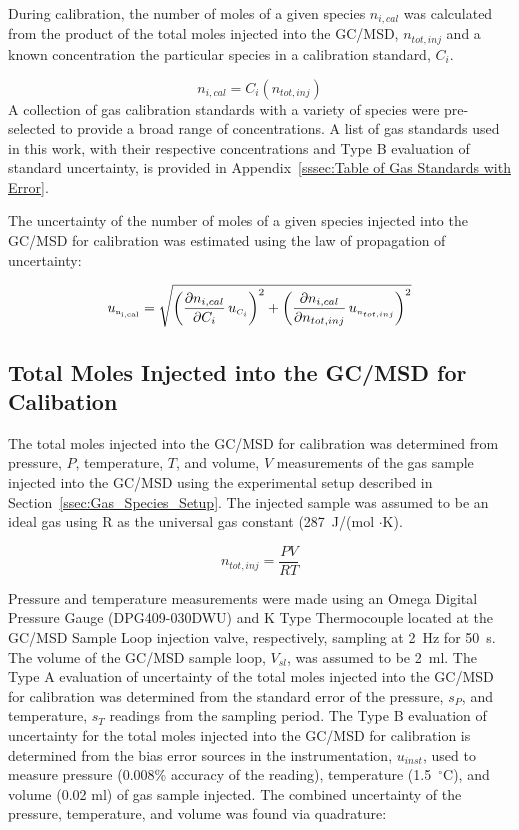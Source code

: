 \documentclass[12pt]{article}
\begin{document}
During calibration, the number of moles of a given species $n_{i,cal}$ was calculated from the product of the total moles injected into the GC/MSD, $n_{tot,inj}$ and a known concentration the particular species in a calibration standard, $C_{i}$.

\begin{equation}
\label{eq:Cal_Moles}
n_{i,cal} = C_{i}(n_{tot,inj})
\end{equation}
A collection of gas calibration standards with a variety of species were pre-selected to provide a broad range of concentrations. A list of gas standards used in this work, with their respective concentrations and Type B evaluation of standard uncertainty, is provided in Appendix~\ref{sssec:Table of Gas Standards with Error}.

The uncertainty of the number of moles of a given species injected into the GC/MSD for calibration was estimated using the law of propagation of uncertainty:

\begin{equation}
\label{eq:Given_Moles_Cal_Uncertainty}
 u_{\rm \scriptscriptstyle n_{i,cal}} = \sqrt{{\left( \frac{\partial n_{i,cal}}{\partial C_{i}}\,u_{\scriptscriptstyle C_{i}} \right)}^2+{\left(\frac{\partial n_{i,cal}}{\partial n_{tot,inj}}\,u_{\scriptscriptstyle n_{tot,inj}}\right)}^2}
\end{equation}

\subsection{Total Moles Injected into the GC/MSD for Calibation}
\label{ssec:Total Moles Injected into the GC/MSD for Calibation}

The total moles injected into the GC/MSD for calibration was determined from pressure, $P$, temperature, $T$, and volume, $V$ measurements of the gas sample injected into the GC/MSD using the experimental setup described in Section~\ref{ssec:Gas_Species_Setup}. The injected sample was assumed to be an ideal gas using R as the universal gas constant (287~J/(mol $\cdot$K).

\begin{equation}
\label{eq:molesinjected}
n_{tot, inj} = \frac{PV}{RT}
\end{equation}

Pressure and temperature measurements were made using an Omega Digital Pressure Gauge (DPG409-030DWU) and K Type Thermocouple located at the GC/MSD Sample Loop injection valve, respectively, sampling at 2~\si{Hz} for 50~\si{s}. The volume of the GC/MSD sample loop, $V_{sl}$, was assumed to be 2~\si{ml}. The Type A evaluation of uncertainty of the total moles injected into the GC/MSD for calibration was determined from the standard error of the pressure, $s_{P}$, and temperature, $s_{T}$ readings from the sampling period. The Type B evaluation of uncertainty for the total moles injected into the GC/MSD for calibration is determined from the bias error sources in the instrumentation, $u_{inst}$, used to measure pressure (0.008\% accuracy of the reading), temperature (1.5~$^\circ$C), and volume (0.02 ml) of gas sample injected. The combined uncertainty of the pressure, temperature, and volume was found via quadrature:
\end{document}
